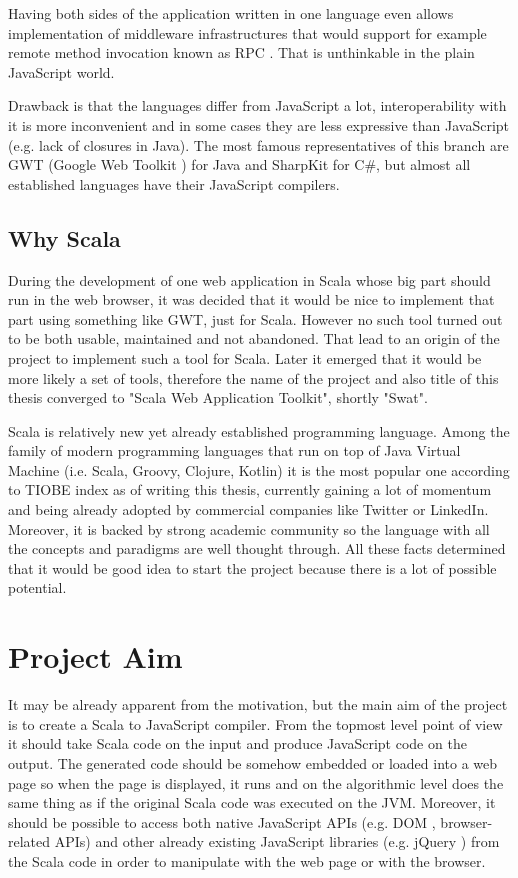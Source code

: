 \documentclass[12pt,a4paper]{report}
\begin{document}
Having both sides of the application written in one language even allows implementation of middleware infrastructures that would support for example remote method invocation known as RPC \cite{Rpc}. That is unthinkable in the plain JavaScript world.

Drawback is that the languages differ from JavaScript a lot, interoperability with it is more inconvenient and in some cases they are less expressive than JavaScript (e.g. lack of closures in Java). The most famous representatives of this branch are GWT (Google Web Toolkit \cite{Gwt}) for Java and SharpKit \cite{SharpKit} for C\#, but almost all established languages have their JavaScript compilers.

\subsection{Why Scala}

During the development of one web application in Scala whose big part should run in the web browser, it was decided that it would be nice to implement that part using something like GWT, just for Scala. However no such tool turned out to be both usable, maintained and not abandoned. That lead to an origin of the project to implement such a tool for Scala. Later it emerged that it would be more likely a set of tools, therefore the name of the project and also title of this thesis converged to "Scala Web Application Toolkit", shortly "Swat".

Scala is relatively new yet already established programming language. Among the family of modern programming languages that run on top of Java Virtual Machine (i.e. Scala, Groovy, Clojure, Kotlin) it is the most popular one according to TIOBE index \cite{Tiobe} as of writing this thesis, currently gaining a lot of momentum and being already adopted by commercial companies like Twitter or LinkedIn. Moreover, it is backed by strong academic community so the language with all the concepts and paradigms are well thought through. All these facts determined that it would be good idea to start the project because there is a lot of possible potential.

\section{Project Aim}

It may be already apparent from the motivation, but the main aim of the project is to create a Scala to JavaScript compiler. From the topmost level point of view it should take Scala code on the input and produce JavaScript code on the output. The generated code should be somehow embedded or loaded into a web page so when the page is displayed, it runs and on the algorithmic level does the same thing as if the original Scala code was executed on the JVM. Moreover, it should be possible to access both native JavaScript APIs (e.g. DOM \cite{Dom}, browser-related APIs) and other already existing JavaScript libraries (e.g. jQuery \cite{Jquery}) from the Scala code in order to manipulate with the web page or with the browser.
\end{document}
